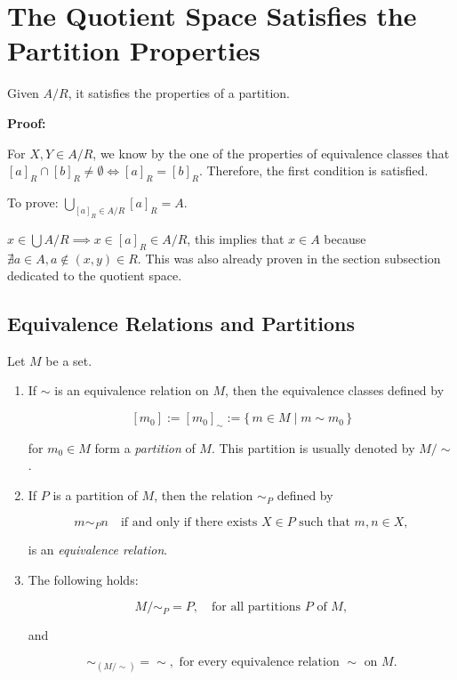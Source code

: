\QED

\section{The Quotient Space Satisfies the Partition Properties}

Given \(A/R\), it satisfies the properties of a partition.

\textbf{Proof:}

For \(X, Y \in A/R\), we know by the one of the properties of equivalence classes that \([a]_R \cap [b]_R \neq \emptyset \iff [a]_R = [b]_R\).
Therefore, the first condition is satisfied.

To prove: \(\bigcup_{[a]_R \in A/R} [a]_R = A\).

\(x \in \bigcup A/R \implies x \in [a]_R \in A/R\), this implies that \(x \in A\) because \(\nexists a \in A, a \notin (x, y) \in R\). This was also already proven in the section
subsection dedicated to the quotient space.

\QED

\subsection{Equivalence Relations and Partitions}

Let \( M \) be a set.

\begin{enumerate}

	\item If \( \sim \) is an equivalence relation on \( M \), then the equivalence classes defined by

	      \[
		      [m_0] := [m_0]_{\sim} := \{\, m \in M \mid m \sim m_0 \,\}
	      \]

	      for \( m_0 \in M \) form a \emph{partition} of \( M \).
	      This partition is usually denoted by \( M / \!\sim \).

	\item If \( P \) is a partition of \( M \), then the relation \( \sim_P \) defined by

	      \[
		      m \sim_P n \quad \text{if and only if there exists } X \in P \text{ such that } m, n \in X,
	      \]

	      is an \emph{equivalence relation}.

	\item The following holds:

	      \[
		      M / \!\sim_P = P,
		      \quad \text{for all partitions } P \text{ of } M,
	      \]

	      and

	      \[
		      \sim_{(M / \!\sim)} = \sim, \text{ for every equivalence relation } \sim \text{ on } M.
	      \]

\end{enumerate}


